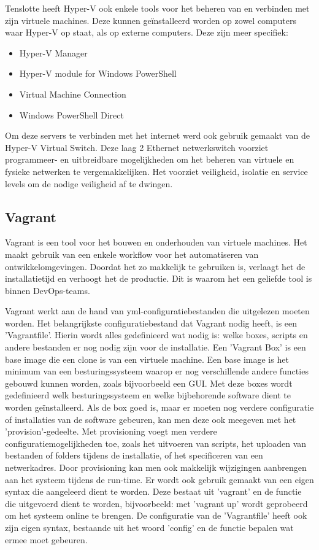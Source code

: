 Tenslotte heeft Hyper-V ook enkele tools voor het beheren van en verbinden met zijn virtuele machines. Deze kunnen geïnstalleerd worden op zowel computers waar Hyper-V op staat, als op externe computers. Deze zijn meer specifiek:

\begin{itemize}[noitemsep]
	\item Hyper-V Manager
	\item Hyper-V module for Windows PowerShell
	\item Virtual Machine Connection
	\item Windows PowerShell Direct
\end{itemize}

Om deze servers te verbinden met het internet werd ook gebruik gemaakt van de Hyper-V
Virtual Switch. Deze laag 2 Ethernet netwerkswitch voorziet programmeer- en uitbreidbare
mogelijkheden om het beheren van virtuele en fysieke netwerken te vergemakkelijken.
Het voorziet veiligheid, isolatie en service levels om de nodige veiligheid af te dwingen.

\subsection{Vagrant}
Vagrant is een tool voor het bouwen en onderhouden van virtuele machines. Het maakt gebruik van een enkele workflow voor het automatiseren van ontwikkelomgevingen. Doordat het zo makkelijk te gebruiken is, verlaagt het de installatietijd en verhoogt het de productie. Dit is waarom het een geliefde tool is binnen DevOps-teams.

Vagrant werkt aan de hand van yml-configuratiebestanden die uitgelezen moeten worden. Het belangrijkste configuratiebestand dat Vagrant nodig heeft, is een ’Vagrantfile’. Hierin wordt alles gedefinieerd wat nodig is: welke boxes, scripts en andere bestanden er nog nodig zijn voor de installatie. Een 'Vagrant Box' is een base image die een clone is van een virtuele machine. Een base image is het minimum van een besturingssysteem waarop er nog verschillende andere functies gebouwd kunnen worden, zoals bijvoorbeeld een GUI. Met deze boxes wordt gedefinieerd welk besturingssysteem en welke bijbehorende software dient te worden geïnstalleerd. Als de box goed is, maar er moeten nog verdere configuratie of installaties van de software gebeuren, kan men deze ook meegeven met het ’provision’-gedeelte. Met provisioning voegt men verdere configuratiemogelijkheden toe, zoals het uitvoeren van scripts, het uploaden van bestanden of folders tijdens de installatie, of het specificeren van een netwerkadres. Door provisioning kan men ook makkelijk wijzigingen aanbrengen aan het systeem tijdens de run-time. Er wordt ook gebruik gemaakt van een eigen syntax die aangeleerd dient te worden. Deze bestaat uit 'vagrant' en de functie die uitgevoerd dient te worden, bijvoorbeeld: met 'vagrant up' wordt geprobeerd om het systeem online te brengen. De configuratie van de 'Vagrantfile' heeft ook zijn eigen syntax, bestaande uit het woord ’config’ en de functie bepalen wat ermee moet gebeuren.

